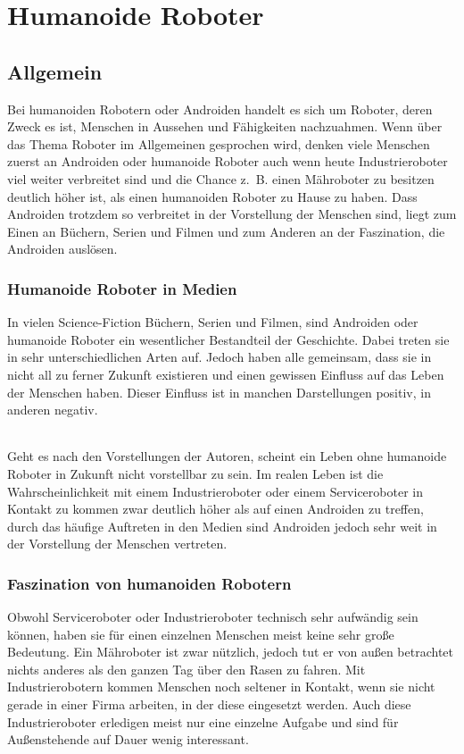 \chapter{Humanoide Roboter}\label{sec:humanoide-roboter}
\section{Allgemein}\label{sec:allgemein}
Bei humanoiden Robotern oder Androiden handelt es sich um Roboter,
deren Zweck es ist, Menschen in Aussehen und Fähigkeiten nachzuahmen. Wenn über
das Thema Roboter im Allgemeinen gesprochen wird, denken viele Menschen zuerst
an Androiden oder humanoide Roboter auch wenn heute Industrieroboter viel
weiter verbreitet sind und die Chance z.~B. einen Mähroboter zu besitzen
deutlich höher ist, als einen humanoiden Roboter zu Hause zu haben. Dass
Androiden trotzdem so verbreitet in der Vorstellung der Menschen sind, liegt
zum Einen an Büchern, Serien und Filmen und zum Anderen an der Faszination, die
Androiden auslösen. \cite{Dautenhahn2011}

\subsection{Humanoide Roboter in Medien}
In vielen Science-Fiction Büchern, Serien und Filmen, sind Androiden oder
humanoide Roboter ein wesentlicher Bestandteil der Geschichte. Dabei treten sie
in sehr unterschiedlichen Arten auf. Jedoch haben alle gemeinsam, dass sie in
nicht all zu ferner Zukunft existieren und einen gewissen Einfluss auf das Leben
der Menschen haben. Dieser Einfluss ist in manchen Darstellungen positiv, in
anderen negativ.

\subparagraph{}
Geht es nach den Vorstellungen der Autoren,
scheint ein Leben ohne humanoide Roboter in Zukunft nicht vorstellbar zu sein.
Im realen Leben ist die Wahrscheinlichkeit mit einem Industrieroboter oder einem
Serviceroboter in Kontakt zu kommen zwar deutlich höher als auf einen Androiden
zu treffen, durch das häufige Auftreten in den Medien sind Androiden jedoch
sehr weit in der Vorstellung der Menschen vertreten.

\subsection{Faszination von humanoiden Robotern}
Obwohl Serviceroboter oder Industrieroboter technisch sehr aufwändig sein
können, haben sie für einen einzelnen Menschen meist keine sehr große Bedeutung.
Ein Mähroboter ist zwar nützlich, jedoch tut er von außen betrachtet nichts
anderes als den ganzen Tag über den Rasen zu fahren. Mit Industrierobotern
kommen Menschen noch seltener in Kontakt, wenn sie nicht gerade in einer Firma
arbeiten, in der diese eingesetzt werden. Auch diese Industrieroboter erledigen
meist nur eine einzelne Aufgabe und sind für Außenstehende auf Dauer wenig
interessant.

